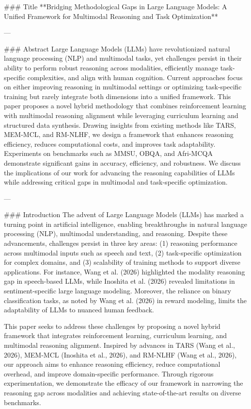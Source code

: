 ### Title
**Bridging Methodological Gaps in Large Language Models: A Unified Framework for Multimodal Reasoning and Task Optimization**

---

### Abstract
Large Language Models (LLMs) have revolutionized natural language processing (NLP) and multimodal tasks, yet challenges persist in their ability to perform robust reasoning across modalities, efficiently manage task-specific complexities, and align with human cognition. Current approaches focus on either improving reasoning in multimodal settings or optimizing task-specific training but rarely integrate both dimensions into a unified framework. This paper proposes a novel hybrid methodology that combines reinforcement learning with multimodal reasoning alignment while leveraging curriculum learning and structured data synthesis. Drawing insights from existing methods like TARS, MEM-MCL, and RM-NLHF, we design a framework that enhances reasoning efficiency, reduces computational costs, and improves task adaptability. Experiments on benchmarks such as MMSU, OBQA, and Afri-MCQA demonstrate significant gains in accuracy, efficiency, and robustness. We discuss the implications of our work for advancing the reasoning capabilities of LLMs while addressing critical gaps in multimodal and task-specific optimization.

---

### Introduction
The advent of Large Language Models (LLMs) has marked a turning point in artificial intelligence, enabling breakthroughs in natural language processing (NLP), multimodal understanding, and reasoning. Despite these advancements, challenges persist in three key areas: (1) reasoning performance across multimodal inputs such as speech and text, (2) task-specific optimization for complex domains, and (3) scalability of training methods to support diverse applications. For instance, Wang et al. (2026) highlighted the modality reasoning gap in speech-based LLMs, while Inoshita et al. (2026) revealed limitations in sentiment-specific large language modeling. Moreover, the reliance on binary classification tasks, as noted by Wang et al. (2026) in reward modeling, limits the adaptability of LLMs to nuanced human feedback.

This paper seeks to address these challenges by proposing a novel hybrid framework that integrates reinforcement learning, curriculum learning, and multimodal reasoning alignment. Inspired by advances in TARS (Wang et al., 2026), MEM-MCL (Inoshita et al., 2026), and RM-NLHF (Wang et al., 2026), our approach aims to enhance reasoning efficiency, reduce computational overhead, and improve domain-specific performance. Through rigorous experimentation, we demonstrate the efficacy of our framework in narrowing the reasoning gap across modalities and achieving state-of-the-art results on diverse benchmarks.

